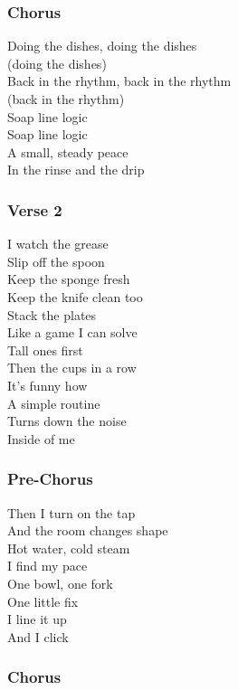 \subsubsection{Chorus}\label{chorus-64}

Doing the dishes, doing the dishes\\
(doing the dishes)\\
Back in the rhythm, back in the rhythm\\
(back in the rhythm)\\
Soap line logic\\
Soap line logic\\
A small, steady peace\\
In the rinse and the drip

\subsubsection{Verse 2}\label{verse-2-20}

I watch the grease\\
Slip off the spoon\\
Keep the sponge fresh\\
Keep the knife clean too\\
Stack the plates\\
Like a game I can solve\\
Tall ones first\\
Then the cups in a row\\
It's funny how\\
A simple routine\\
Turns down the noise\\
Inside of me

\subsubsection{Pre-Chorus}\label{pre-chorus-47}

Then I turn on the tap\\
And the room changes shape\\
Hot water, cold steam\\
I find my pace\\
One bowl, one fork\\
One little fix\\
I line it up\\
And I click

\subsubsection{Chorus}\label{chorus-65}

